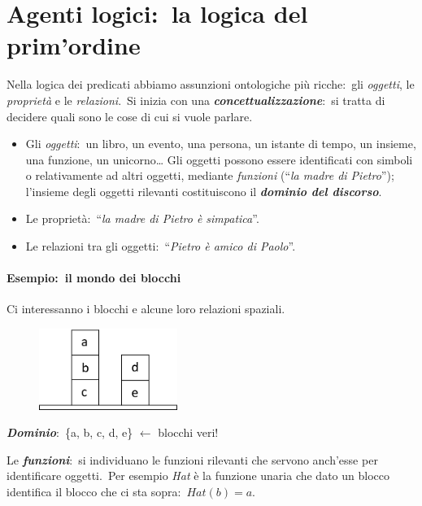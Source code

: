 \chapter{Agenti logici:\ la logica del prim'ordine}

Nella logica dei predicati abbiamo assunzioni ontologiche più ricche:\ gli \textit{oggetti}, le \textit{proprietà} e le \textit{relazioni}.\
Si inizia con una \textbf{\textit{concettualizzazione}}:\ si tratta di decidere quali sono le cose di cui si vuole parlare.
\begin{itemize}
	\item Gli \textit{oggetti}:\ un libro, un evento, una persona, un istante di tempo, un insieme, una funzione, un unicorno\dots
	      Gli oggetti possono essere identificati con simboli o relativamente ad altri oggetti, mediante \textit{funzioni} (``\textit{la madre di Pietro}''); l'insieme degli oggetti rilevanti costituiscono il \textbf{\textit{dominio del discorso}}.\
	\item Le proprietà:\ ``\textit{la madre di Pietro è simpatica}''.
	\item Le relazioni tra gli oggetti:\ ``\textit{Pietro è amico di Paolo}''.
\end{itemize}

\subsubsection{Esempio:\ il mondo dei blocchi}

Ci interessanno i blocchi e alcune loro relazioni spaziali.\

\begin{figure}[H]
	\centering
	\includegraphics[width=0.4\textwidth]{immagini/mondo_blocchi.png}
\end{figure}

\noindent\textbf{\textit{Dominio}}:\ \{a, b, c, d, e\} $\leftarrow$ blocchi veri!\

\noindent Le \textbf{\textit{funzioni}}:\ si individuano le funzioni rilevanti che servono anch'esse per identificare oggetti.\ Per esempio \textit{Hat} è la funzione unaria che dato un blocco identifica il blocco che ci sta sopra:\ $Hat(b)=a$.\

